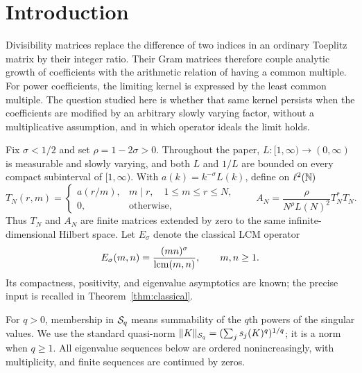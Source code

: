 \section{Introduction}
\label{sec:introduction}

Divisibility matrices replace the difference of two indices in an ordinary
Toeplitz matrix by their integer ratio. Their Gram matrices therefore
couple analytic growth of coefficients with the arithmetic relation of
having a common multiple. For power coefficients, the limiting kernel
is expressed by the least common multiple. The question studied here is
whether that same kernel persists when the coefficients are modified by
an arbitrary slowly varying factor, without a multiplicative assumption,
and in which operator ideals the limit holds.

Fix $\sigma<1/2$ and set $\rho=1-2\sigma>0$. Throughout the paper,
$L:[1,\infty)\to(0,\infty)$ is measurable and slowly varying, and both
$L$ and $1/L$ are bounded on every compact subinterval of $[1,\infty)$.
With $a(k)=k^{-\sigma}L(k)$, define on $\ell^2(\mathbb N)$
\begin{equation}
 T_N(r,m)=
 \begin{cases}
 a(r/m),&m\mid r,\quad 1\le m\le r\le N,\\
 0,&\text{otherwise},
 \end{cases}
 \qquad
 A_N=\frac{\rho}{N^\rho L(N)^2}T_N^*T_N.
 \label{eq:operators}
\end{equation}
Thus $T_N$ and $A_N$ are finite matrices extended by zero to the same
infinite-dimensional Hilbert space. Let $E_\sigma$ denote the classical
LCM operator
\begin{equation}
 E_\sigma(m,n)=\frac{(mn)^\sigma}{\operatorname{lcm}(m,n)},\qquad m,n\ge1.
 \label{eq:kernel}
\end{equation}
Its compactness, positivity, and eigenvalue asymptotics are known; the
precise input is recalled in Theorem~\ref{thm:classical}.

For $q>0$, membership in $\mathcal S_q$ means summability of the $q$th powers
of the singular values. We use the standard quasi-norm
$\lVert K\rVert_{\mathcal S_q}=(\sum_j s_j(K)^q)^{1/q}$; it is a norm when $q\ge1$.
All eigenvalue sequences below are ordered nonincreasingly, with
multiplicity, and finite sequences are continued by zeros.

